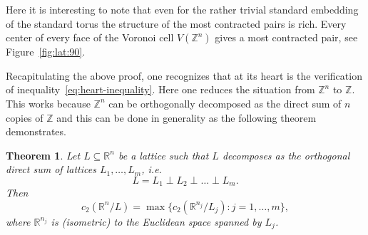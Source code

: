 \documentclass{amsart}
\newtheorem{theorem}[defin]{Theorem}
\newcommand{\R}{\mathbb{R}}
\newcommand{\Z}{\mathbb{Z}}
\begin{document}
Here it is interesting to note that even for the rather trivial
standard embedding of the standard torus the structure of the most
contracted pairs is rich. Every center of every face of the Voronoi
cell $V(\Z^n)$ gives a most contracted pair, see Figure~\ref{fig:lat:90}.



\medskip

Recapitulating the above proof, one recognizes that at its heart is the
verification of inequality~\eqref{eq:heart-inequality}. Here one
reduces the situation from $\Z^n$ to $\Z$. This works because $\Z^n$
can be orthogonally decomposed as the direct sum of $n$ copies of $\Z$
and this can be done in generality as the following theorem
demonstrates.

\begin{theorem}
\label{thm:direct-sum}
Let $L \subseteq \R^n$ be a lattice such that $L$ decomposes as the
orthogonal direct sum of lattices $L_1, \ldots, L_m$, i.e.
\begin{equation*}
  L = L_1 \perp L_2 \perp \ldots \perp L_m.
\end{equation*}
Then
\begin{equation*}
c_2(\R^n/L) = \max \{ c_2(\R^{n_j}/L_j) : j = 1, \ldots, m\},
\end{equation*}
where $\R^{n_j}$ is (isometric) to the Euclidean space spanned by
$L_j$.
\end{theorem}
\end{document}
